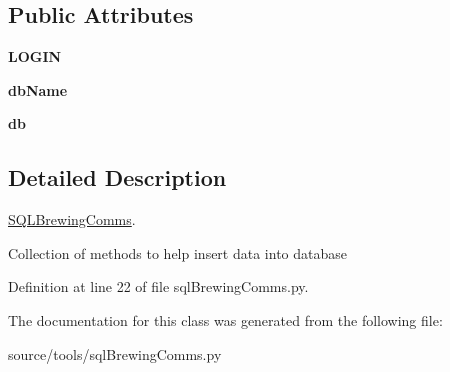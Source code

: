 \subsection*{Public Attributes}
\begin{DoxyCompactItemize}
\item 
\mbox{\label{classsql_brewing_comms_1_1_s_q_l_brewing_comms_ac0294d566639cd37b47abc675693bcd2}} 
{\bfseries L\+O\+G\+IN}
\item 
\mbox{\label{classsql_brewing_comms_1_1_s_q_l_brewing_comms_ae57314d6d160ffd5dd7166536e80760d}} 
{\bfseries db\+Name}
\item 
\mbox{\label{classsql_brewing_comms_1_1_s_q_l_brewing_comms_abcfc99b26d6577f67955822dca613c25}} 
{\bfseries db}
\end{DoxyCompactItemize}


\subsection{Detailed Description}
\mbox{\hyperlink{classsql_brewing_comms_1_1_s_q_l_brewing_comms}{S\+Q\+L\+Brewing\+Comms}}. 

Collection of methods to help insert data into database 

Definition at line 22 of file sql\+Brewing\+Comms.\+py.



The documentation for this class was generated from the following file\+:\begin{DoxyCompactItemize}
\item 
source/tools/sql\+Brewing\+Comms.\+py\end{DoxyCompactItemize}

